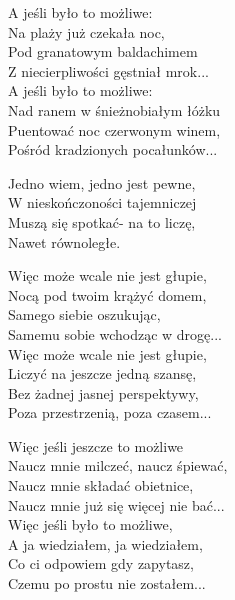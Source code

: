 \begin{text}
A jeśli było to możliwe:\\
Na plaży już czekała noc,\\
Pod granatowym baldachimem\\
Z niecierpliwości gęstniał mrok...\\
A jeśli było to możliwe:\\
Nad ranem w śnieżnobiałym łóżku\\
Puentować noc czerwonym winem,\\
Pośród kradzionych pocałunków...

\vin Jedno wiem, jedno jest pewne,\\
\vin W nieskończoności tajemniczej\\
\vin Muszą się spotkać- na to liczę,\\
\vin Nawet równoległe.

Więc może wcale nie jest głupie,\\
Nocą pod twoim krążyć domem,\\
Samego siebie oszukując,\\
Samemu sobie wchodząc w drogę...\\
Więc może wcale nie jest głupie,\\
Liczyć na jeszcze jedną szansę,\\
Bez żadnej jasnej perspektywy,\\
Poza przestrzenią, poza czasem...

Więc jeśli jeszcze to możliwe\\
Naucz mnie milczeć, naucz śpiewać,\\
Naucz mnie składać obietnice,\\
Naucz mnie już się więcej nie bać...\\
Więc jeśli było to możliwe,\\
A ja wiedziałem, ja wiedziałem,\\
Co ci odpowiem gdy zapytasz,\\
Czemu po prostu nie zostałem...
\end{text}
